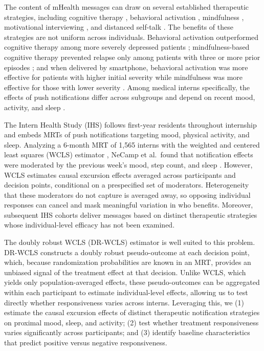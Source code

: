 \documentclass[11pt,letterpaper]{article}
\begin{document}
The content of mHealth messages can draw on several established therapeutic
strategies, including cognitive therapy \cite{beck_cognitive_2024,
linardon_efficacy_2019}, behavioral activation \cite{lewinsohn_behavioral_1974,
dimidjian_randomized_2006}, mindfulness \cite{teasdale_prevention_2000,
economides_improvements_2018}, motivational interviewing
\cite{rubak_motivational_2005, shingleton_technology-delivered_2016}, and
distanced self-talk \cite{kross_self-distancing_2017}. The benefits of these
strategies are not uniform across individuals. Behavioral activation
outperformed cognitive therapy among more severely depressed patients
\cite{dimidjian_randomized_2006}; mindfulness-based cognitive therapy prevented
relapse only among patients with three or more prior episodes
\cite{teasdale_prevention_2000}; and when delivered by smartphone, behavioral
activation was more effective for patients with higher initial severity while
mindfulness was more effective for those with lower severity
\cite{ly_behavioural_2014}. Among medical interns specifically, the effects of
push notifications differ across subgroups \cite{xu_uncovering_2023} and depend
on recent mood, activity, and sleep \cite{necamp_assessing_2020}.

The Intern Health Study (IHS) follows first-year residents throughout
internship and embeds MRTs of push notifications targeting mood, physical
activity, and sleep. Analyzing a 6-month MRT of 1{,}565 interns with the weighted
and centered least squares (WCLS) estimator \cite{boruvka_assessing_2017}, NeCamp
et al.\ found that notification effects were moderated by the previous week's
mood, step count, and sleep \cite{necamp_assessing_2020}. However, WCLS estimates
causal excursion effects averaged across participants and decision points,
conditional on a prespecified set of moderators. Heterogeneity that these
moderators do not capture is averaged away, so opposing individual responses can
cancel and mask meaningful variation in who benefits. Moreover, subsequent IHS
cohorts deliver messages based on distinct therapeutic strategies whose
individual-level efficacy has not been examined.

The doubly robust WCLS (DR-WCLS) estimator \cite{shi_meta-learning_2025} is well
suited to this problem. DR-WCLS constructs a doubly robust pseudo-outcome at
each decision point, which, because randomization probabilities are known in an
MRT, provides an unbiased signal of the treatment effect at that decision.
Unlike WCLS, which yields only population-averaged effects, these pseudo-outcomes
can be aggregated within each participant to estimate individual-level effects,
allowing us to test directly whether responsiveness varies across interns.
Leveraging this, we (1) estimate the causal excursion effects of distinct
therapeutic notification strategies on proximal mood, sleep, and activity;
(2) test whether treatment responsiveness varies significantly across
participants; and (3) identify baseline characteristics that predict positive
versus negative responsiveness.
\end{document}
